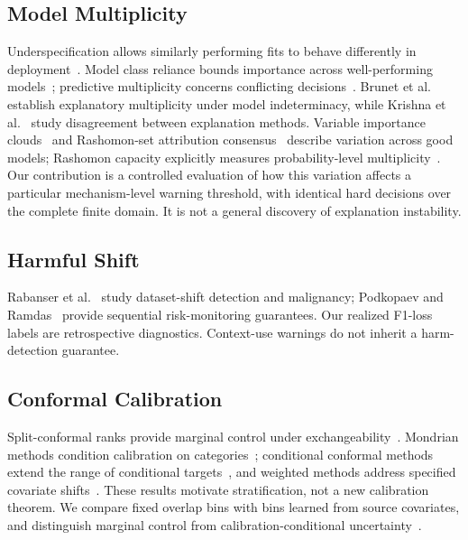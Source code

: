 \documentclass[conference]{IEEEtran}
\begin{document}
\subsection{Model Multiplicity}
Underspecification allows similarly performing fits to behave differently in deployment~\cite{damour2022underspecification}. Model class reliance bounds importance across well-performing models~\cite{fisher2019models}; predictive multiplicity concerns conflicting decisions~\cite{marx2020multiplicity}. Brunet et al.~\cite{brunet2022indeterminacy} establish explanatory multiplicity under model indeterminacy, while Krishna et al.~\cite{krishna2024disagreement} study disagreement between explanation methods. Variable importance clouds~\cite{dong2020clouds} and Rashomon-set attribution consensus~\cite{laberge2023consensus} describe variation across good models; Rashomon capacity explicitly measures probability-level multiplicity~\cite{hsu2022rashomon}. Our contribution is a controlled evaluation of how this variation affects a particular mechanism-level warning threshold, with identical hard decisions over the complete finite domain. It is not a general discovery of explanation instability.

\subsection{Harmful Shift}
Rabanser et al.~\cite{rabanser2019failing} study dataset-shift detection and malignancy; Podkopaev and Ramdas~\cite{podkopaev2022tracking} provide sequential risk-monitoring guarantees. Our realized F1-loss labels are retrospective diagnostics. Context-use warnings do not inherit a harm-detection guarantee.

\subsection{Conformal Calibration}
Split-conformal ranks provide marginal control under exchangeability~\cite{angelopoulos2023conformal}. Mondrian methods condition calibration on categories~\cite{vovk2005algorithmic,vovk2012conditional}; conditional conformal methods extend the range of conditional targets~\cite{gibbs2025conditional}, and weighted methods address specified covariate shifts~\cite{tibshirani2019shift}. These results motivate stratification, not a new calibration theorem. We compare fixed overlap bins with bins learned from source covariates, and distinguish marginal control from calibration-conditional uncertainty~\cite{vovk2012conditional,bates2023outliers}.
\end{document}

